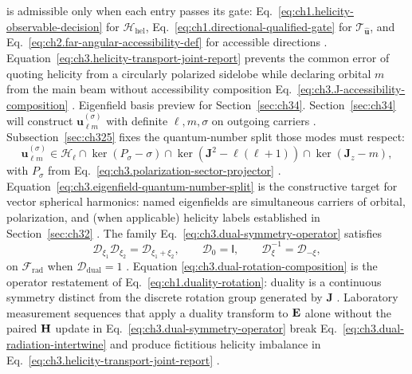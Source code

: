 is admissible only when each entry passes its gate:
Eq.~\eqref{eq:ch1.helicity-observable-decision} for \(\mathcal{H}_{\mathrm{hel}}\),
Eq.~\eqref{eq:ch1.directional-qualified-gate} for \(\mathcal{T}_{\hat{\mathbf{u}}}\),
and Eq.~\eqref{eq:ch2.far-angular-accessibility-def} for accessible directions
\cite{stratton1941}. Equation~\eqref{eq:ch3.helicity-transport-joint-report} prevents the common
error of quoting helicity from a circularly polarized sidelobe while declaring orbital \(m\) from the main beam
without accessibility composition Eq.~\eqref{eq:ch3.J-accessibility-composition} \cite{harrington2001}.
Eigenfield basis preview for Section~\ref{sec:ch34}. Section~\ref{sec:ch34} will construct \(\mathbf{u}_{\ell m}^{(\sigma)}\) with definite \(\ell,m,\sigma\) on
outgoing carriers \cite{hansen1988}. Subsection~\ref{sec:ch325} fixes the quantum-number split those
modes must respect:
\begin{equation}
\label{eq:ch3.eigenfield-quantum-number-split}
\mathbf{u}_{\ell m}^{(\sigma)}
\in
\mathcal{H}_{\ell}\cap
\ker(P_{\sigma}-\sigma)\cap
\ker(\mathbf{J}^{2}-\ell(\ell+1))\cap
\ker(\mathbf{J}_{z}-m),
\end{equation}
with \(P_{\sigma}\) from Eq.~\eqref{eq:ch3.polarization-sector-projector} \cite{hansen1988}.
Equation~\eqref{eq:ch3.eigenfield-quantum-number-split} is the constructive target for vector spherical
harmonics: named eigenfields are simultaneous carriers of orbital, polarization, and (when applicable) helicity
labels established in Section~\ref{sec:ch32} \cite{hansen1988}.
The family Eq.~\eqref{eq:ch3.dual-symmetry-operator} satisfies
\begin{equation}
\label{eq:ch3.dual-rotation-composition}
\mathcal{D}_{\xi_1}\mathcal{D}_{\xi_2}
=
\mathcal{D}_{\xi_1+\xi_2},
\qquad
\mathcal{D}_{0}=\mathsf{I},
\qquad
\mathcal{D}_{\xi}^{-1}=\mathcal{D}_{-\xi},
\end{equation}
on \(\mathcal{F}_{\mathrm{rad}}\) when \(\mathcal{D}_{\mathrm{dual}}=1\) \cite{stratton1941}. Equation
\eqref{eq:ch3.dual-rotation-composition} is the operator restatement of
Eq.~\eqref{eq:ch1.duality-rotation}: duality is a continuous symmetry distinct from the discrete rotation group
generated by \(\mathbf{J}\) \cite{jackson1999}. Laboratory measurement sequences that apply a duality transform
to \(\mathbf{E}\) alone without the paired \(\mathbf{H}\) update in Eq.~\eqref{eq:ch3.dual-symmetry-operator} break
Eq.~\eqref{eq:ch3.dual-radiation-intertwine} and produce fictitious helicity imbalance in
Eq.~\eqref{eq:ch3.helicity-transport-joint-report} \cite{harrington2001}.
